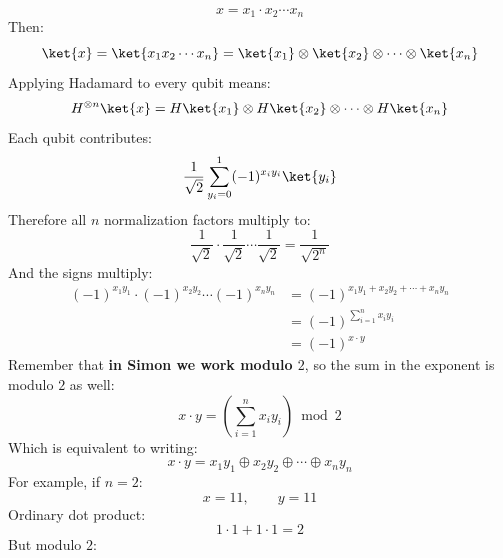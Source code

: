 \begin{remarkbox}[: Explain $H\ket{x} = \frac{1}{\sqrt{2}} \sum_{y\in\{0,1\}} (-1)^{xy}\ket{y}$]
    \begin{equation*}
        x = x_1 \cdot x_2 \cdots x_n
    \end{equation*}
    Then:
    \begin{equation*}
        \ket{x} = \ket{x_1 x_2 \cdots x_n} = \ket{x_1} \otimes \ket{x_2} \otimes \cdots \otimes \ket{x_n}
    \end{equation*}
    Applying Hadamard to every qubit means:
    \begin{equation*}
        H^{\otimes n}\ket{x} = H\ket{x_1} \otimes H\ket{x_2} \otimes \cdots \otimes H\ket{x_n}
    \end{equation*}
    Each qubit contributes:
    \begin{equation*}
        \frac{1}{\sqrt{2}} \sum_{y_i = 0}^{1} (-1)^{x_i y_i} \ket{y_i}
    \end{equation*}
    Therefore all $n$ normalization factors multiply to:
    \begin{equation*}
        \frac{1}{\sqrt{2}} \cdot \frac{1}{\sqrt{2}} \cdots \frac{1}{\sqrt{2}} = \frac{1}{\sqrt{2^n}}
    \end{equation*}
    And the signs multiply:
    \begin{align*}
        \left(-1\right)^{x_1y_1} \cdot \left(-1\right)^{x_2y_2} \cdots \left(-1\right)^{x_ny_n} &= \left(-1\right)^{x_1y_1 + x_2y_2 + \cdots + x_ny_n} \\[.3em]
        &= \left(-1\right)^{\sum_{i=1}^{n} x_i y_i} \\[.3em]
        &= \left(-1\right)^{x \cdot y}
    \end{align*}
    Remember that \textbf{in Simon we work modulo $2$}, so the sum in the exponent is modulo $2$ as well:
    \begin{equation*}
        x \cdot y = \left(\sum_{i=1}^{n} x_i y_i\right) \bmod 2
    \end{equation*}
    Which is equivalent to writing:
    \begin{equation*}
        x\cdot y
        =
        x_1y_1\oplus x_2y_2\oplus\cdots\oplus x_ny_n
    \end{equation*}
    For example, if $n=2$:
    \begin{equation*}
        x=11,\qquad y=11
    \end{equation*}
    Ordinary dot product:
    \begin{equation*}
        1\cdot1+1\cdot1=2
    \end{equation*}
    But modulo $2$:
    \begin{equation*}

\end{equation*}
\end{remarkbox}
